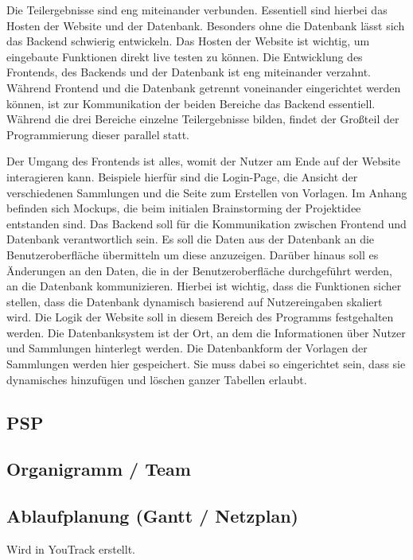 \documentclass[a4paper, 12pt]{article}
\begin{document}
    Die Teilergebnisse sind eng miteinander verbunden.
    Essentiell sind hierbei das Hosten der Website und der Datenbank.
    Besonders ohne die Datenbank lässt sich das Backend schwierig entwickeln.
    Das Hosten der Website ist wichtig, um eingebaute Funktionen direkt live testen zu können.
    Die Entwicklung des Frontends, des Backends und der Datenbank ist eng miteinander verzahnt.
    Während Frontend und die Datenbank getrennt voneinander eingerichtet werden können, ist zur Kommunikation der beiden Bereiche das Backend essentiell.
    Während die drei Bereiche einzelne Teilergebnisse bilden, findet der Großteil der Programmierung dieser parallel statt.

    Der Umgang des Frontends ist alles, womit der Nutzer am Ende auf der Website interagieren kann.
    Beispiele hierfür sind die Login-Page, die Ansicht der verschiedenen Sammlungen und die Seite zum Erstellen von Vorlagen.
    Im Anhang befinden sich Mockups, die beim initialen Brainstorming der Projektidee entstanden sind.
    Das Backend soll für die Kommunikation zwischen Frontend und Datenbank verantwortlich sein.
    Es soll die Daten aus der Datenbank an die Benutzeroberfläche übermitteln um diese anzuzeigen.
    Darüber hinaus soll es Änderungen an den Daten, die in der Benutzeroberfläche durchgeführt werden, an die Datenbank kommunizieren.
    Hierbei ist wichtig, dass die Funktionen sicher stellen, dass die Datenbank dynamisch basierend auf Nutzereingaben skaliert wird.
    Die Logik der Website soll in diesem Bereich des Programms festgehalten werden.
    Die Datenbanksystem ist der Ort, an dem die Informationen über Nutzer und Sammlungen hinterlegt werden.
    Die Datenbankform der Vorlagen der Sammlungen werden hier gespeichert.
    Sie muss dabei so eingerichtet sein, dass sie dynamisches hinzufügen und löschen ganzer Tabellen erlaubt.

    \subsection{PSP}
    
    \subsection{Organigramm / Team}
    
    \subsection{Ablaufplanung (Gantt / Netzplan)}
    Wird in YouTrack erstellt.
    
\end{document}
